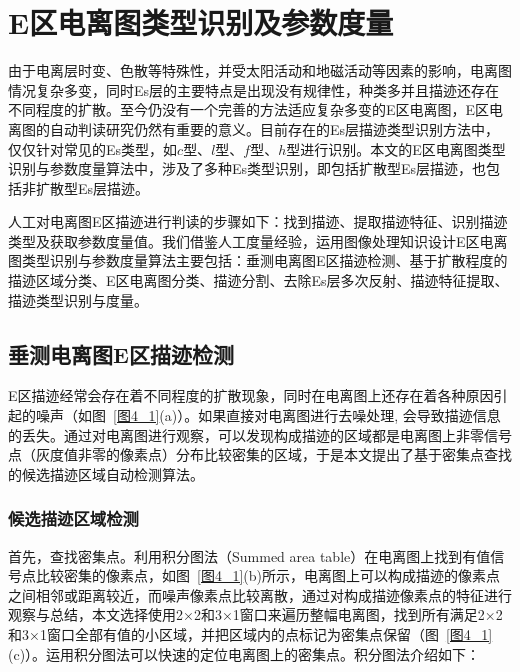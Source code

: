 
\chapter{E区电离图类型识别及参数度量}
\label{cha4}

由于电离层时变、色散等特殊性，并受太阳活动和地磁活动等因素的影响，电离图情况复杂多变\cite{柳文2009基于}，同时Es层的主要特点是出现没有规律性，种类多并且描迹还存在不同程度的扩散。至今仍没有一个完善的方法适应复杂多变的E区电离图，E区电离图的自动判读研究仍然有重要的意义。目前存在的Es层描迹类型识别方法中，仅仅针对常见的Es类型，如$c$型、$l$型、$f$型、$h$型进行识别。本文的E区电离图类型识别与参数度量算法中，涉及了多种Es类型识别，即包括扩散型Es层描迹，也包括非扩散型Es层描迹。
        
人工对电离图E区描迹进行判读的步骤如下：找到描迹、提取描迹特征、识别描迹类型及获取参数度量值。我们借鉴人工度量经验，运用图像处理知识设计E区电离图类型识别与参数度量算法主要包括：垂测电离图E区描迹检测、基于扩散程度的描迹区域分类、E区电离图分类、描迹分割、去除Es层多次反射、描迹特征提取、描迹类型识别与度量。

\section{垂测电离图E区描迹检测}
\label{4_1}

E区描迹经常会存在着不同程度的扩散现象，同时在电离图上还存在着各种原因引起的噪声（如图~\ref{图4_1}(a)）。如果直接对电离图进行去噪处理, 会导致描迹信息的丢失。通过对电离图进行观察，可以发现构成描迹的区域都是电离图上非零信号点（灰度值非零的像素点）分布比较密集的区域，于是本文提出了基于密集点查找的候选描迹区域自动检测算法。

\subsection{候选描迹区域检测}
\label{4_1_1}

首先，查找密集点。利用积分图法（Summed area table）\cite{crow1984summed}在电离图上找到有值信号点比较密集的像素点，如图~\ref{图4_1}(b)所示，电离图上可以构成描迹的像素点之间相邻或距离较近，而噪声像素点比较离散，通过对构成描迹像素点的特征进行观察与总结，本文选择使用2×2和3×1窗口来遍历整幅电离图，找到所有满足2×2和3×1窗口全部有值的小区域，并把区域内的点标记为密集点保留（图~\ref{图4_1}(c)）。运用积分图法可以快速的定位电离图上的密集点。积分图法介绍如下：

